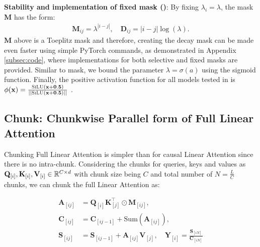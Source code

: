  \textbf{Stability and implementation of fixed mask (\colorbox{ violet!20}{\lionretnet})}: By fixing $\lambda_i = \lambda$, the mask $\mathbf{M}$ has the form:
\begin{align}
    \mathbf{M}_{ij} = \lambda^{|i-j|}, \quad \mathbf{D}_{ij} = |i-j|\log(\lambda) .
\end{align}
$\mathbf{M}$ above is a Toeplitz mask \cite{tnn} and therefore, creating the decay mask can be made even faster using simple PyTorch commands, as demonstrated in Appendix \ref{subsec:code}, where implementations for both selective and fixed masks are provided. Similar to \lions mask, we bound the parameter \(\lambda = \sigma(a)\) using the sigmoid function. Finally, the positive activation function for all models tested in \lion is \(\phi(\mathbf{x}) = \frac{\textsc{SiLU}(\mathbf{x+0.5})}{||\textsc{SiLU}(\mathbf{x+0.5})||}\) \cite{henry2020query}. 

\subsection{\lion Chunk: Chunkwise Parallel form of Full Linear Attention} \label{sec:chunk}

Chunking Full Linear Attention is simpler than for causal Linear Attention since there is no intra-chunk. Considering the chunks for queries, keys and values as $\mathbf{Q}_{[i]},\mathbf{K}_{[i]},\mathbf{V}_{[i]} \in \mathbb{R}^{C\times d}$ with chunk size being $C$ and total number of $N=\frac{L}{C}$ chunks, we can chunk the full Linear Attention as:

\begin{tcolorbox}[colback=gray!2!white, colframe=black, boxrule=0.2mm, arc=4mm ,boxsep=0.1pt, left=0.0pt, right=2pt, top=0pt, bottom=0pt]
\begin{align} \label{chunklion}
    \mathbf{A}_{[ij]} & = \mathbf{Q}_{[i]}\mathbf{K}_{[j]}^\top \odot \mathbf{M}_{[ij]}, \\ \mathbf{C}_{[ij]} &= \mathbf{C}_{[ij-1]} + \text{Sum} (\mathbf{A}_{[ij]}), \\
     \mathbf{S}_{[ij]} & =\mathbf{S}_{[ij-1]} + \mathbf{A}_{[ij]} \mathbf{V}_{[j]} , \quad \mathbf{Y}_{[i]} = \frac{\mathbf{S}_{[iN]}}{\mathbf{C}_{[iN]}}
\end{align}
\end{tcolorbox}

